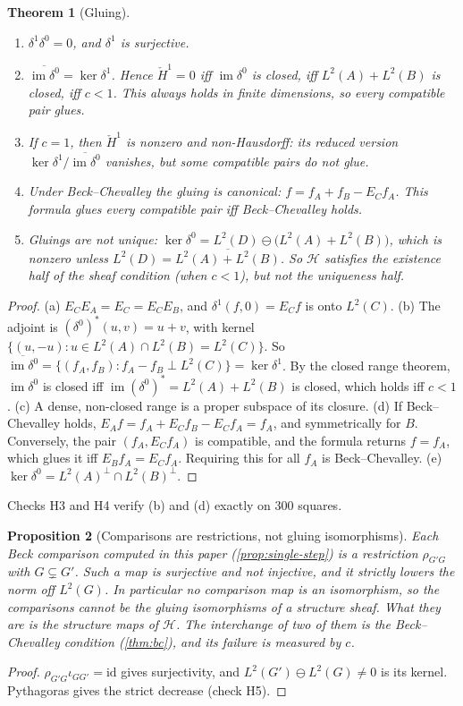 \documentclass[11pt]{article}
\newtheorem{theorem}{Theorem}[section]
\newtheorem{proposition}[theorem]{Proposition}
\theoremstyle{definition}
\newcommand{\id}{\mathrm{id}}
\begin{document}
\begin{theorem}[Gluing]\label{thm:gluing}
\begin{enumerate}[label=(\alph*)]
\item $\delta^1\delta^0=0$, and $\delta^1$ is surjective.
\item $\overline{\operatorname{im}\delta^0}=\ker\delta^1$. Hence $\check H^1=0$ iff $\operatorname{im}\delta^0$ is closed, iff
  $L^2(A)+L^2(B)$ is closed, iff $c<1$. This always holds in finite dimensions, so every compatible pair glues.
\item If $c=1$, then $\check H^1$ is nonzero and non-Hausdorff: its reduced version $\ker\delta^1/\overline{\operatorname{im}\delta^0}$
  vanishes, but some compatible pairs do not glue.
\item Under Beck--Chevalley the gluing is canonical: $f=f_A+f_B-E_Cf_A$. This formula glues every compatible pair iff
  Beck--Chevalley holds.
\item Gluings are not unique: $\ker\delta^0=L^2(D)\ominus\big(L^2(A)+L^2(B)\big)$, which is nonzero unless
  $L^2(D)=\overline{L^2(A)+L^2(B)}$. So $\mathcal H$ satisfies the existence half of the sheaf condition (when $c<1$), but not the
  uniqueness half.
\end{enumerate}
\end{theorem}
\begin{proof}
(a) $E_CE_A=E_C=E_CE_B$, and $\delta^1(f,0)=E_Cf$ is onto $L^2(C)$.
(b) The adjoint is $(\delta^0)^*(u,v)=u+v$, with kernel $\{(u,-u):u\in L^2(A)\cap L^2(B)=L^2(C)\}$. So
$\overline{\operatorname{im}\delta^0}=\{(f_A,f_B):f_A-f_B\perp L^2(C)\}=\ker\delta^1$. By the closed range theorem,
$\operatorname{im}\delta^0$ is closed iff $\operatorname{im}(\delta^0)^*=L^2(A)+L^2(B)$ is closed, which holds iff $c<1$
\cite{Deutsch2001}.
(c) A dense, non-closed range is a proper subspace of its closure.
(d) If Beck--Chevalley holds, $E_Af=f_A+E_Cf_B-E_Cf_A=f_A$, and symmetrically for $B$. Conversely, the pair $(f_A,E_Cf_A)$ is
compatible, and the formula returns $f=f_A$, which glues it iff $E_Bf_A=E_Cf_A$. Requiring this for all $f_A$ is Beck--Chevalley.
(e) $\ker\delta^0=L^2(A)^\perp\cap L^2(B)^\perp$.
\end{proof}

Checks H3 and H4 verify (b) and (d) exactly on 300 squares.

\begin{proposition}[Comparisons are restrictions, not gluing isomorphisms]\label{prop:not-iso}
Each Beck comparison computed in this paper (\cref{prop:single-step}) is a restriction $\rho_{G'G}$ with $G\subsetneq G'$. Such a map is
surjective and not injective, and it strictly lowers the norm off $L^2(G)$. In particular no comparison map is an isomorphism, so the
comparisons cannot be the gluing isomorphisms of a structure sheaf. What they are is the structure maps of $\mathcal H$. The
interchange of two of them is the Beck--Chevalley condition (\cref{thm:bc}), and its failure is measured by $c$.
\end{proposition}
\begin{proof}
$\rho_{G'G}\iota_{GG'}=\id$ gives surjectivity, and $L^2(G')\ominus L^2(G)\ne0$ is its kernel. Pythagoras gives the strict decrease (check
H5).
\end{proof}
\end{document}
